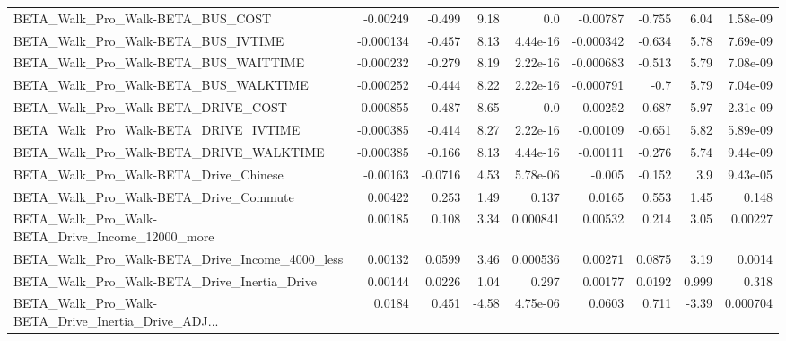 \begin{tabular}{lrrrrrrrr}
BETA\_Walk\_Pro\_Walk-BETA\_BUS\_COST                   &    -0.00249 &       -0.499 &     9.18 &      0.0 &   -0.00787 &      -0.755 &         6.04 &      1.58e-09 \\
BETA\_Walk\_Pro\_Walk-BETA\_BUS\_IVTIME                 &   -0.000134 &       -0.457 &     8.13 & 4.44e-16 &  -0.000342 &      -0.634 &         5.78 &      7.69e-09 \\
BETA\_Walk\_Pro\_Walk-BETA\_BUS\_WAITTIME               &   -0.000232 &       -0.279 &     8.19 & 2.22e-16 &  -0.000683 &      -0.513 &         5.79 &      7.08e-09 \\
BETA\_Walk\_Pro\_Walk-BETA\_BUS\_WALKTIME               &   -0.000252 &       -0.444 &     8.22 & 2.22e-16 &  -0.000791 &        -0.7 &         5.79 &      7.04e-09 \\
BETA\_Walk\_Pro\_Walk-BETA\_DRIVE\_COST                 &   -0.000855 &       -0.487 &     8.65 &      0.0 &   -0.00252 &      -0.687 &         5.97 &      2.31e-09 \\
BETA\_Walk\_Pro\_Walk-BETA\_DRIVE\_IVTIME               &   -0.000385 &       -0.414 &     8.27 & 2.22e-16 &   -0.00109 &      -0.651 &         5.82 &      5.89e-09 \\
BETA\_Walk\_Pro\_Walk-BETA\_DRIVE\_WALKTIME             &   -0.000385 &       -0.166 &     8.13 & 4.44e-16 &   -0.00111 &      -0.276 &         5.74 &      9.44e-09 \\
BETA\_Walk\_Pro\_Walk-BETA\_Drive\_Chinese              &    -0.00163 &      -0.0716 &     4.53 & 5.78e-06 &     -0.005 &      -0.152 &          3.9 &      9.43e-05 \\
BETA\_Walk\_Pro\_Walk-BETA\_Drive\_Commute              &     0.00422 &        0.253 &     1.49 &    0.137 &     0.0165 &       0.553 &         1.45 &         0.148 \\
BETA\_Walk\_Pro\_Walk-BETA\_Drive\_Income\_12000\_more    &     0.00185 &        0.108 &     3.34 & 0.000841 &    0.00532 &       0.214 &         3.05 &       0.00227 \\
BETA\_Walk\_Pro\_Walk-BETA\_Drive\_Income\_4000\_less     &     0.00132 &       0.0599 &     3.46 & 0.000536 &    0.00271 &      0.0875 &         3.19 &        0.0014 \\
BETA\_Walk\_Pro\_Walk-BETA\_Drive\_Inertia\_Drive        &     0.00144 &       0.0226 &     1.04 &    0.297 &    0.00177 &      0.0192 &        0.999 &         0.318 \\
BETA\_Walk\_Pro\_Walk-BETA\_Drive\_Inertia\_Drive\_ADJ... &      0.0184 &        0.451 &    -4.58 & 4.75e-06 &     0.0603 &       0.711 &        -3.39 &      0.000704 \\

\end{tabular}
